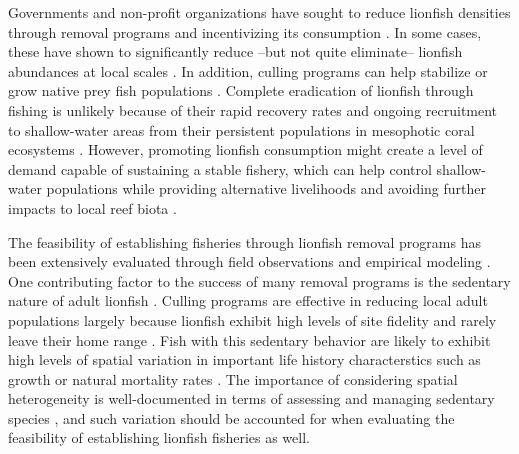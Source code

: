\documentclass[fleqn,10pt,lineno]{wlpeerj} %
\begin{document}
Governments and non-profit organizations have sought to reduce lionfish
densities through removal programs and incentivizing its consumption
\citep{chin_2016}. In some cases, these have shown to significantly
reduce --but not quite eliminate-- lionfish abundances at local scales
\citep{sandel_2015,chin_2016,deleon_2013}. In addition, culling programs
can help stabilize or grow native prey fish populations
\citep{cote_2014}. Complete eradication of lionfish through fishing is
unlikely because of their rapid recovery rates and ongoing recruitment
to shallow-water areas from their persistent populations in mesophotic
coral ecosystems \citep{barbour_2011,andradibrown_2017}. However,
promoting lionfish consumption might create a level of demand capable of
sustaining a stable fishery, which can help control shallow-water
populations while providing alternative livelihoods and avoiding further
impacts to local reef biota \citep{chin_2016}.

The feasibility of establishing fisheries through lionfish removal
programs has been extensively evaluated through field observations and
empirical modeling
\citep{barbour_2011,morris_2011,deleon_2013,johnston_2015,sandel_2015,chin_2016,usseglio_2017}.
One contributing factor to the success of many removal programs is the
sedentary nature of adult lionfish \citep{jud_2012}. Culling programs
are effective in reducing local adult populations largely because
lionfish exhibit high levels of site fidelity and rarely leave their
home range \citep{Fishelson_1997,cote_2014,kochzius_2005}. Fish with
this sedentary behavior are likely to exhibit high levels of spatial
variation in important life history characterstics such as growth or
natural mortality rates \citep{hutchinson_2008,wilson_2012}. The
importance of considering spatial heterogeneity is well-documented in
terms of assessing and managing sedentary species
\citep{gunderson_2008,guan_2013}, and such variation should be accounted
for when evaluating the feasibility of establishing lionfish fisheries
as well.
\end{document}
